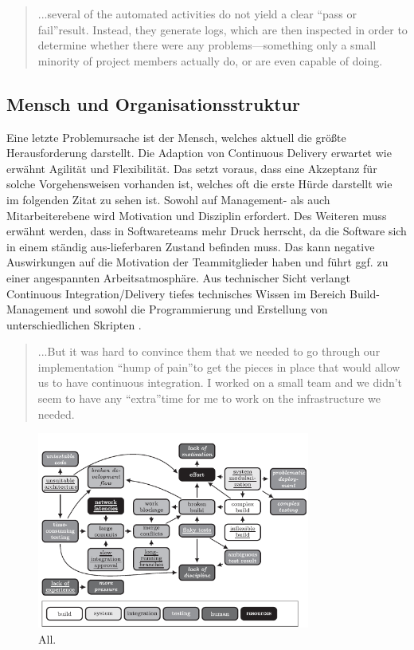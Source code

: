 \begin{quote}\glqq ...several of the automated activities do not yield a clear “pass or fail”result. Instead, they generate logs, which are then inspected in order to determine whether there were any problems—something only a small minority of project members actually do, or are even capable of doing. \grqq~\cite[S.65]{Laukkanen.2017}\end{quote}
%

\subsection{Mensch und Organisationsstruktur}
Eine letzte Problemursache ist der Mensch, welches aktuell die größte Herausforderung darstellt. Die Adaption von Continuous Delivery erwartet wie erwähnt Agilität und Flexibilität. Das setzt voraus, dass eine Akzeptanz für solche Vorgehensweisen vorhanden ist, welches oft die erste Hürde darstellt wie im folgenden Zitat zu sehen ist. Sowohl auf Management- als auch Mitarbeiterebene wird Motivation und Disziplin erfordert. Des Weiteren muss erwähnt werden, dass in Softwareteams mehr Druck herrscht, da die Software sich in einem ständig aus-lieferbaren Zustand befinden muss. Das kann negative Auswirkungen auf die Motivation der Teammitglieder haben und führt ggf. zu einer angespannten Arbeitsatmosphäre. Aus technischer Sicht verlangt Continuous Integration/Delivery tiefes technisches Wissen im Bereich Build-Management und sowohl die Programmierung und Erstellung von unterschiedlichen Skripten \cite{Laukkanen.2017}. 

\begin{quote}\glqq ...But it was hard to convince them that we needed to go through our implementation “hump of pain”to get the pieces in place that would allow us to have continuous integration. I worked on a small team and we didn’t seem to have any “extra”time for me to work on the infrastructure we needed. \grqq~\cite[S.373]{Stolberg.2009} \end{quote}
%

\begin{figure}[ht]
	\centering
	\includegraphics[width=0.8\textwidth,]{images/all}
	\caption{All\cite{Laukkanen.2017}.}
	\label{integrationsprobleme}
\end{figure}